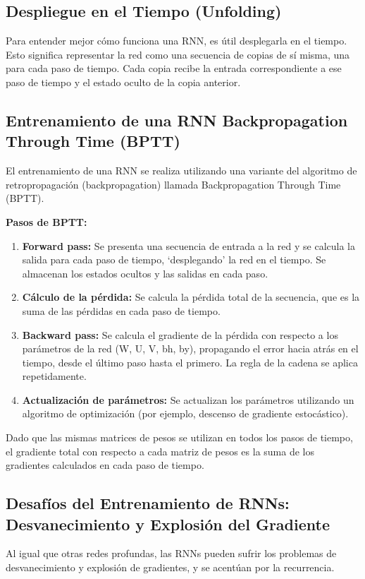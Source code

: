 \documentclass{article}
\begin{document}
\subsection{Despliegue en el Tiempo (Unfolding)}

Para entender mejor cómo funciona una RNN, es útil desplegarla en el tiempo.  Esto significa representar la red como una secuencia de copias de sí misma, una para cada paso de tiempo.  Cada copia recibe la entrada correspondiente a ese paso de tiempo y el estado oculto de la copia anterior.

\subsection{Entrenamiento de una RNN Backpropagation Through Time (BPTT)}

El entrenamiento de una RNN se realiza utilizando una variante del algoritmo de retropropagación (backpropagation) llamada Backpropagation Through Time (BPTT).

\textbf{Pasos de BPTT:}

\begin{enumerate}
    \item \textbf{Forward pass:} Se presenta una secuencia de entrada a la red y se calcula la salida para cada paso de tiempo, `desplegando' la red en el tiempo.  Se almacenan los estados ocultos y las salidas en cada paso.
    \item \textbf{Cálculo de la pérdida:} Se calcula la pérdida total de la secuencia, que es la suma de las pérdidas en cada paso de tiempo.
    \item \textbf{Backward pass:} Se calcula el gradiente de la pérdida con respecto a los parámetros de la red (W, U, V, bh, by), propagando el error hacia atrás en el tiempo, desde el último paso hasta el primero.  La regla de la cadena se aplica repetidamente.
    \item \textbf{Actualización de parámetros:} Se actualizan los parámetros utilizando un algoritmo de optimización (por ejemplo, descenso de gradiente estocástico).
\end{enumerate}

Dado que las mismas matrices de pesos se utilizan en todos los pasos de tiempo, el gradiente total con respecto a cada matriz de pesos es la suma de los gradientes calculados en cada paso de tiempo.

\subsection{Desafíos del Entrenamiento de RNNs: Desvanecimiento y Explosión del Gradiente}
Al igual que otras redes profundas, las RNNs pueden sufrir los problemas de desvanecimiento y explosión de gradientes, y se acentúan por la recurrencia.
\end{document}
